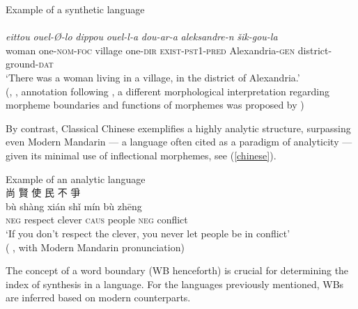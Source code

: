 \documentclass[output=paper,colorlinks,citecolor=brown ,chinesefont]{langscibook}
\begin{document}
\begin{exe}
\ex\label{oldnubian} Example of a synthetic language \\
\settowidth {}
\glll {}       \\
\textit{eittou} \textit{ouel-Ø-lo}	\textit{dippou} \textit{ouel-l-a} 	\textit{dou-ar-a} 	  \textit{aleksandre-n} 	  \textit{šik-gou-la} \\
woman 	one-\textsc{nom}-\textsc{foc} 	village one-\textsc{dir}  	\textsc{exist}-\textsc{pst}1-\textsc{pred}  Alexandria-\textsc{gen}  district-ground-\textsc{dat}  \\ 
\glt ‘There was a woman living in a village, in the district of Alexandria.' \\
\hspace*{\fill}(, \citet[5]{browne}, annotation following \citet[67]{gervenoei}, a different morphological interpretation regarding morpheme boundaries and functions of morphemes was proposed by \citet[751]{satzinger})
\end{exe}

By contrast, Classical Chinese exemplifies a highly analytic structure, surpassing even Modern Mandarin — a language often cited as a paradigm of analyticity — given its minimal use of inflectional morphemes, see (\ref{chinese}).

\begin{exe}
\ex\label{chinese} Example of an analytic language \\ 
\settowidth {}
 {\cn 尚} {\cn 賢} {\cn 使} {\cn 民} {\cn 不} {\cn 爭}\\
 bù	shàng xián shǐ mín	bù zhēng \\
\textsc{neg} 	respect	clever	\textsc{caus} 	people	\textsc{neg} 	conflict \\ 
\glt ‘If you don’t respect the clever, you never let people be in conflict' \\
\hspace*{\fill}( \citep{laotzi}, with Modern Mandarin pronunciation)
\end{exe}

The concept of a word boundary (WB henceforth) is crucial for determining the index of synthesis in a language. For the languages previously mentioned, WBs are inferred based on modern counterparts.
\end{document}

